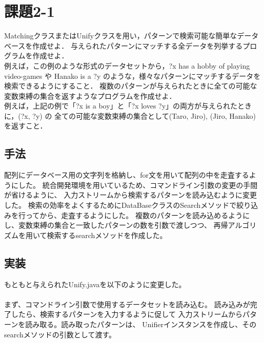 \documentclass{jarticle}
\begin{document}
\section{課題2-1}
\begin{screen}
    MatchingクラスまたはUnifyクラスを用い，パターンで検索可能な簡単なデータベースを作成せよ．
    与えられたパターンにマッチする全データを列挙するプログラムを作成せよ．
    \\ 例えば，この例のような形式のデータセットから，?x has a hobby of playing video-games や 
    Hanako is a ?y のような，様々なパターンにマッチするデータを検索できるようにすること．
    複数のパターンが与えられたときに全ての可能な変数束縛の集合を返すようなプログラムを作成せよ．
    \\ 例えば，上記の例で「?x is a boy」と「?x loves ?y」の両方が与えられたときに，(?x, ?y) の
    全ての可能な変数束縛の集合として{(Taro, Jiro), (Jiro, Hanako)}を返すこと．
\end{screen}
\subsection{手法}
    配列にデータベース用の文字列を格納し、for文を用いて配列の中を走査するようにした。
    統合開発環境を用いているため、コマンドライン引数の変更の手間が省けるように、
    入力ストリームから検索するパターンを読み込むように変更した。
    検索の効率をよくするためにDataBaseクラスのSearchメソッドで絞り込みを行ってから、走査するようにした。
    複数のパターンを読み込めるようにし、変数束縛の集合と一致したパターンの数を引数で渡しつつ、
    再帰アルゴリズムを用いて検索するsearchメソッドを作成した。

\subsection{実装}
    もともと与えられたUnify.javaを以下のように変更した。
    \paragraph{}
    まず、コマンドライン引数で使用するデータセットを読み込む。
    読み込みが完了したら、検索するパターンを入力するように促して
    入力ストリームからパターンを読み取る。読み取ったパターンは、
    Unifierインスタンスを作成し、そのsearchメソッドの引数として渡す。
\end{document}
